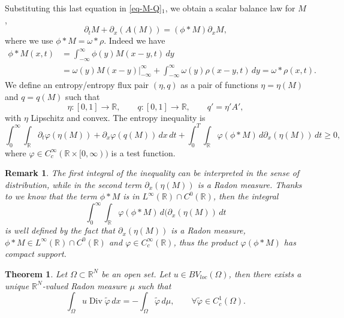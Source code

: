 \documentclass[11pt,a4paper,oneside]{amsart}
\newtheorem{theorem}[definition]{Theorem}
\newtheorem{rem}[definition]{Remark}
\DeclareMathOperator{\Div}{Div}
\newcommand\R{\mathbb{R}}
\begin{document}
Substituting this last equation in \eqref{eq-M-Q}$_1$, %
we obtain a scalar balance law for $M$,
\begin{equation}\label{scalar balance law}
    \partial_tM+\partial_x(A(M))=(\phi\ast M)\partial_x M,
\end{equation}
where we use 
$
\phi\ast M=\omega\ast\rho.
$
Indeed we have
\begin{align*}
\phi\ast M(x,t)&=\int_{-\infty}^{\infty}\phi(y)M(x-y,t)\,dy\\
&=\omega(y)M(x-y)|_{-\infty}^{\infty}+\int_{-\infty}^{\infty}\omega(y)\rho(x-y,t)\,dy=\omega\ast\rho(x,t).
\end{align*}
We define an entropy/entropy flux pair $(\eta, q)$ as a pair of functions $\eta=\eta(M)$ and $q=q(M)$ such that
$$
\eta:[0,1]\to\R,\qquad  q:[0,1]\to\R,\qquad q'=\eta'A',
$$
with $\eta$ Lipschitz and convex. The entropy inequality is
\begin{equation}\label{eq:entropy_inequality}
\int_0^\infty\int_\R \partial_t\varphi(\eta(M))+\partial_x\varphi(q(M))\,dx\,dt+\int_0^T\int_\R\varphi(\phi\ast M)\,d\partial_x(\eta(M))\,dt\geq0,
\end{equation}
where $\varphi\in C_c^\infty(\R\times[0,\infty))$ is a test function.
\begin{rem}
The first integral of the inequality can be interpreted in the sense of distribution, while in the second term $\partial_x(\eta(M))$ is a Radon measure. 
Thanks to \cite[Th. 4.19 (Young)]{Cannarsa-D'Aprile} we know that the term $\phi\ast M$ is in $L^\infty(\R)\cap C^0(\R)$, then
the integral
\begin{equation}\label{def:int-eta}
\int_0^\infty\int_\R \varphi(\phi\ast M)\,d(\partial_x(\eta(M))\,dt
\end{equation}
is well defined by the fact that $\partial_x(\eta(M))$ is a Radon measure, $\phi\ast M\in L^\infty(\R)\cap C^0(\R)$ and $\varphi\in C_c^\infty(\R)$,  thus the product $\varphi(\phi\ast M)$ has compact support.
\end{rem}
\begin{theorem}
    Let $\Omega\subset\R^N$ be an open set. Let $u\in BV_{loc}(\Omega)$, then there exists a unique 
    $\R^N$-valued Radon measure $\mu$ such that 
    $$
    \int_\Omega u \Div  \tilde\varphi\,dx=-\int_\Omega \tilde\varphi\,d\mu,\qquad \forall \tilde\varphi\in C_c^1(\Omega).
    $$
\end{theorem}
\end{document}
